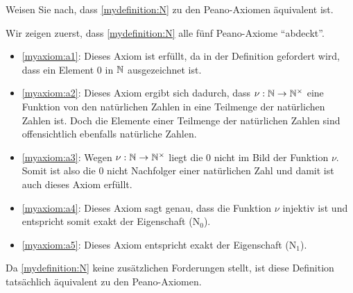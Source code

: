 \begin{myexercise}\label{myexercise:0105}
	Weisen Sie nach, dass \cref{mydefinition:N} zu den Peano-Axiomen äquivalent ist.
	\begin{myanswer}
		Wir zeigen zuerst, dass \cref{mydefinition:N} alle fünf Peano-Axiome \enquote{abdeckt}.
		\begin{itemize}
      \item \cref{myaxiom:a1}: Dieses Axiom ist erfüllt, da in der Definition gefordert wird, dass ein Element $0$ in $\mathbb{N}$ ausgezeichnet ist.
      \item \cref{myaxiom:a2}: Dieses Axiom ergibt sich dadurch, dass $\nu:\mathbb{N}\to\mathbb{N}^{\times}$ eine Funktion von den natürlichen Zahlen in eine Teilmenge der natürlichen Zahlen ist. Doch die Elemente einer Teilmenge der natürlichen Zahlen sind offensichtlich ebenfalls natürliche Zahlen.
			\item \cref{myaxiom:a3}: Wegen $\nu:\mathbb{N}\to\mathbb{N}^{\times}$ liegt die $0$ nicht im Bild der Funktion $\nu$.
			      Somit ist also die $0$ nicht Nachfolger einer natürlichen Zahl und damit ist auch dieses Axiom erfüllt.
			\item \cref{myaxiom:a4}: Dieses Axiom sagt genau, dass die Funktion $\nu$ injektiv ist und entspricht somit exakt der Eigenschaft (N$_0$).
			\item \cref{myaxiom:a5}: Dieses Axiom entspricht exakt der Eigenschaft (N$_1$).
		\end{itemize}
		Da \cref{mydefinition:N} keine zusätzlichen Forderungen stellt, ist diese Definition tatsächlich äquivalent zu den Peano-Axiomen.
	\end{myanswer}
\end{myexercise}


